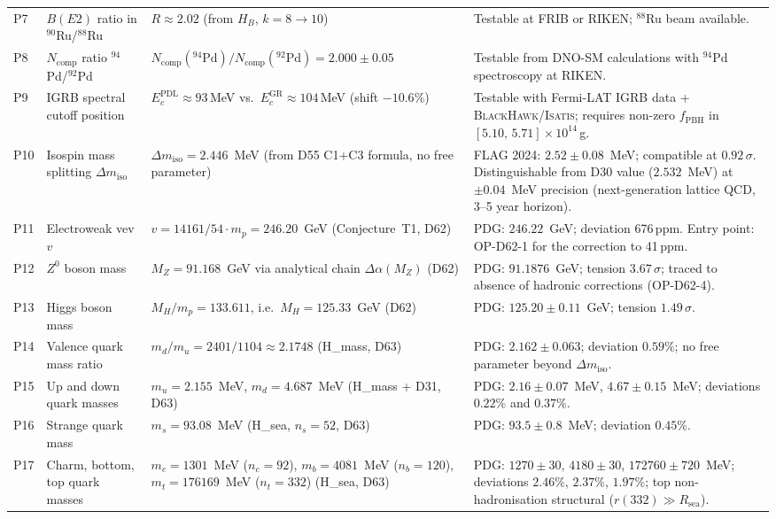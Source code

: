 \documentclass[11pt,a4paper]{article}
\theoremstyle{plain}
\theoremstyle{definition}
\theoremstyle{remark}
\begin{document}
\begin{longtable}{L{0.5cm}L{3.2cm}L{5.2cm}L{4.2cm}}
P7 & $B(E2)$ ratio in $^{90}$Ru/$^{88}$Ru & $R\approx 2.02$ (from $H_B$, $k=8\to10$) & Testable at FRIB or RIKEN; $^{88}$Ru beam available.\\[0.4em]
P8 & $N_{\mathrm{comp}}$ ratio $^{94}$Pd/$^{92}$Pd & $N_{\mathrm{comp}}(^{94}\mathrm{Pd})/N_{\mathrm{comp}}(^{92}\mathrm{Pd})=2.000\pm0.05$ & Testable from DNO-SM calculations with $^{94}$Pd spectroscopy at RIKEN.\\[0.4em]
P9 & IGRB spectral cutoff position & $E_c^{\mathrm{PDL}} \approx 93$\,MeV vs.\ $E_c^{\mathrm{GR}} \approx 104$\,MeV (shift $-10.6\%$) & Testable with Fermi-LAT IGRB data + \textsc{BlackHawk}/\textsc{Isatis}; requires non-zero $f_{\mathrm{PBH}}$ in $[5.10,\,5.71]\times10^{14}$\,g.\\[0.4em]
P10 & Isospin mass splitting $\Delta m_{\mathrm{iso}}$ & $\Delta m_{\mathrm{iso}} = 2.446$~MeV (from D55 C1+C3 formula, no free parameter) & FLAG 2024: $2.52 \pm 0.08$~MeV; compatible at $0.92\,\sigma$. Distinguishable from D30 value ($2.532$~MeV) at $\pm 0.04$~MeV precision (next-generation lattice QCD, 3--5 year horizon).\\[0.4em]
P11 & Electroweak vev $v$ & $v = 14161/54\cdot m_p = 246.20$~GeV (Conjecture~T1, D62) & PDG: $246.22$~GeV; deviation 676\,ppm. Entry point: OP-D62-1 for the correction to 41\,ppm.\\[0.4em]
P12 & $Z^0$ boson mass & $M_Z = 91.168$~GeV via analytical chain $\Delta\alpha(M_Z)$ (D62) & PDG: $91.1876$~GeV; tension $3.67\,\sigma$; traced to absence of hadronic corrections (OP-D62-4).\\[0.4em]
P13 & Higgs boson mass & $M_H/m_p = 133.611$, i.e.\ $M_H = 125.33$~GeV (D62) & PDG: $125.20 \pm 0.11$~GeV; tension $1.49\,\sigma$.\\[0.4em]
P14 & Valence quark mass ratio & $m_d/m_u = 2401/1104 \approx 2.1748$ (H\_mass, D63) & PDG: $2.162 \pm 0.063$; deviation $0.59\%$; no free parameter beyond $\Delta m_{\mathrm{iso}}$.\\[0.4em]
P15 & Up and down quark masses & $m_u = 2.155$~MeV, $m_d = 4.687$~MeV (H\_mass + D31, D63) & PDG: $2.16 \pm 0.07$~MeV, $4.67 \pm 0.15$~MeV; deviations $0.22\%$ and $0.37\%$.\\[0.4em]
P16 & Strange quark mass & $m_s = 93.08$~MeV (H\_sea, $n_s=52$, D63) & PDG: $93.5 \pm 0.8$~MeV; deviation $0.45\%$.\\[0.4em]
P17 & Charm, bottom, top quark masses & $m_c = 1301$~MeV ($n_c=92$), $m_b = 4081$~MeV ($n_b=120$), $m_t = 176169$~MeV ($n_t=332$) (H\_sea, D63) & PDG: $1270 \pm 30$, $4180 \pm 30$, $172760 \pm 720$~MeV; deviations $2.46\%$, $2.37\%$, $1.97\%$; top non-hadronisation structural ($r(332) \gg R_{\mathrm{sea}}$).\\[0.4em]

\end{longtable}
\end{document}
